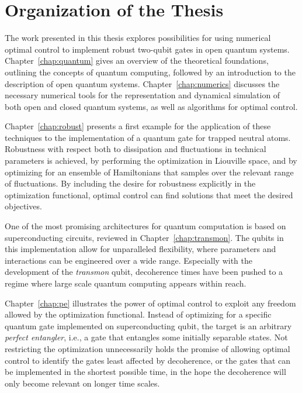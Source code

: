 \section{Organization of the Thesis}

The work presented in this thesis explores possibilities for using numerical
optimal control to implement robust two-qubit gates in open quantum systems.
Chapter~\ref{chap:quantum} gives an overview of the theoretical foundations,
outlining the concepts of quantum computing, followed by an introduction to the
description of open quantum systems.
Chapter~\ref{chap:numerics} discusses the necessary numerical tools for the
representation and dynamical simulation of both open and closed quantum systems,
as well as algorithms for optimal control.

Chapter~\ref{chap:robust} presents a first example for the application of these
techniques to the implementation of a quantum gate for trapped neutral atoms.
Robustness with respect both to dissipation and fluctuations in technical
parameters is achieved, by performing the optimization in Liouville space, and
by optimizing for an ensemble of Hamiltonians that samples over the relevant
range of fluctuations. By including the desire for robustness explicitly in the
optimization functional, optimal control can find solutions that meet the
desired objectives.

One of the most promising architectures for quantum computation is based on
superconducting circuits, reviewed in Chapter~\ref{chap:transmon}. The qubits in
this implementation allow for unparalleled flexibility, where parameters
and interactions can be engineered over a wide range. Especially with
the development of the \emph{transmon} qubit, decoherence times have been pushed
to a regime where large scale quantum computing appears within reach.

Chapter~\ref{chap:pe} illustrates the power of optimal control to exploit
any freedom allowed by the optimization functional. Instead of optimizing for
a specific quantum gate implemented on superconducting qubit, the target is an
arbitrary \emph{perfect entangler}, i.e., a gate that entangles some initially
separable states. Not restricting the optimization unnecessarily holds the
promise of allowing optimal control to identify the gates least affected by
decoherence, or the gates that can be implemented in the shortest possible time,
in the hope the decoherence will only become relevant on longer time scales.

